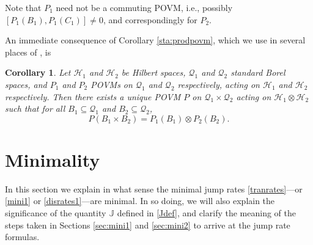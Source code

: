 \documentclass[12pt]{article}
\newcommand{\1}{\mathbf{1}} %
\newcommand{\Hilbert}{\mathscr{H}}
\newcommand{\conf}{\mathcal{Q}} %
\newcommand{\current}{\mathbb{J}}
\newcommand{\pov}{{P}}%
\newtheorem{corollary}{Corollary}
\begin{document}
Note that $\pov_1$ need not be a commuting POVM, i.e., possibly 
$[\pov_1(B_1),
\pov_1(C_1)] \neq 0$, and correspondingly for $\pov_2$.

An immediate consequence of Corollary \ref{sta:prodpovm}, which we use
in several places of \cite{crea2B}, is

\begin{corollary}\label{sta:tensorpovm}
   Let $\Hilbert_1$ and $\Hilbert_2$ be Hilbert spaces, $\conf_1$ and
   $\conf_2$ standard Borel spaces, and $\pov_1$ and $\pov_2$ POVMs on
   $\conf_1$ and $\conf_2$ respectively, acting on $\Hilbert_1$ and
   $\Hilbert_2$ respectively. Then there exists a unique POVM $\pov$ on
   $\conf_1 \times \conf_2$ acting on $\Hilbert_1 \otimes \Hilbert_2$
   such that for all $B_1 \subseteq \conf_1$ and $B_2 \subseteq
   \conf_2$,
   \begin{equation}\label{tensorpovm}
     \pov(B_1 \times B_2) = \pov_1(B_1) \otimes \pov_2(B_2).
   \end{equation}
\end{corollary}



\section{Minimality}
\label{sec:mini4}

In this section we explain in what sense the minimal jump rates
\eqref{tranrates}---or \eqref{mini1} or \eqref{disrates1}---are
minimal.  In so doing, we will also explain the significance of the
quantity $\current$ defined in \eqref{Jdef}, and clarify the meaning
of the steps taken in Sections \ref{sec:mini1} and \ref{sec:mini2} to
arrive at the jump rate formulas.
\end{document}

